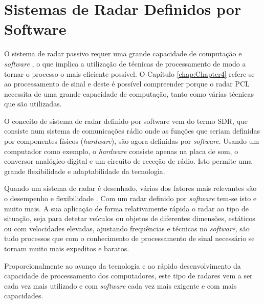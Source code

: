 \section{Sistemas de Radar Definidos por Software}
O sistema de radar passivo requer uma grande capacidade de computação e \textit{software} \parencite{Martorella}, o que implica a utilização de técnicas de processamento de modo a tornar o processo o mais eficiente possível. O Capítulo \ref{chap:Chapter4} refere-se ao processamento de sinal e deste é possível compreender porque o radar \gls{PCL} necessita de uma grande capacidade de computação, tanto como várias técnicas que são utilizadas.\par 
O conceito de sistema de radar definido por software vem do termo \gls{SDR}, que consiste num sistema de comunicações rádio onde as funções que seriam definidas por componentes físicos (\textit{hardware}), são agora definidas por \textit{software}. Usando um computador como exemplo, o \textit{hardware} consiste apenas na placa de som, o conversor analógico-digital e um circuito de receção de rádio. Isto permite uma grande flexibilidade e adaptabilidade da tecnologia.\par 
Quando um sistema de radar é desenhado, vários dos fatores mais relevantes são o desempenho e flexibilidade \parencite{Griffiths2017}. Com um radar definido por \textit{software} tem-se isto e muito mais. A sua aplicação de forma relativamente rápida o radar ao tipo de situação, seja para detetar veículos ou objetos de diferentes dimensões, estáticos ou com velocidades elevadas, ajustando frequências e técnicas no \textit{software}, são tudo processos que com o conhecimento de processamento de sinal necessário se tornam muito mais expeditos e baratos.\par 
Proporcionalmente ao avanço da tecnologia e ao rápido desenvolvimento da capacidade de processamento dos computadores, este tipo de radares vem a ser cada vez mais utilizado e com \textit{software} cada vez mais exigente e com mais capacidades.  

